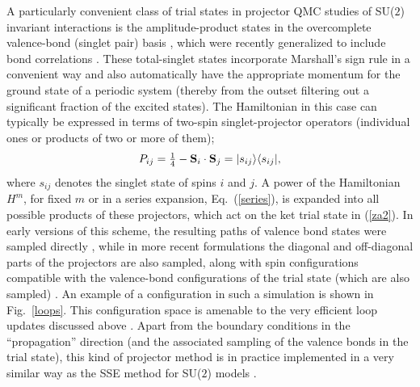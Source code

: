 \documentclass[10pt,pre,aps,twocolumn,showpacs,subscriptaddresses,floatfix]{revtex4}
\begin{document}
A particularly convenient class of trial states in projector QMC studies of SU($2$) invariant interactions is the amplitude-product states in the overcomplete
valence-bond (singlet pair) basis \cite{Liang88}, which were recently generalized to include bond correlations \cite{Lin12}. These total-singlet states incorporate 
Marshall's sign rule in a convenient way and also automatically have the appropriate momentum for the ground state of a periodic system (thereby from the outset 
filtering out a significant fraction of the excited states). The Hamiltonian in this case can typically be expressed in terms of 
two-spin singlet-projector operators  (individual ones or products of two or more of them);
\begin{equation}
P_{ij}=\hbox{$\frac{1}{4}$}-{\bf S}_i\cdot {\bf S}_j = |s_{ij}\rangle\langle s_{ij}|,
\label{psinglet}
\end{equation}
where $s_{ij}$ denotes the singlet state of spins $i$ and $j$. A power of the Hamiltonian $H^m$, for fixed $m$ or in a series expansion, Eq.~(\ref{series}),
is expanded into all possible products of these projectors, which act on the ket trial state in (\ref{za2}). In early versions of this scheme, the resulting 
paths of valence bond states were sampled directly \cite{Liang90,Santoro99,Sandvik05}, while in more recent formulations the diagonal and off-diagonal parts of the 
projectors are also sampled, along with spin configurations compatible with the valence-bond configurations of the trial state (which are also sampled) 
\cite{Sandvik10c}. An example of a configuration in such a simulation is shown in Fig.~\ref{loops}. This configuration space is amenable to the very efficient 
loop updates discussed above \cite{Sandvik10a}. Apart from the boundary conditions in the ``propagation'' direction (and the associated sampling of the
valence bonds in the trial state), this kind of projector method is in practice implemented in a very similar way as the SSE method for SU($2$) 
models \cite{Sandvik10b}.
\end{document}
